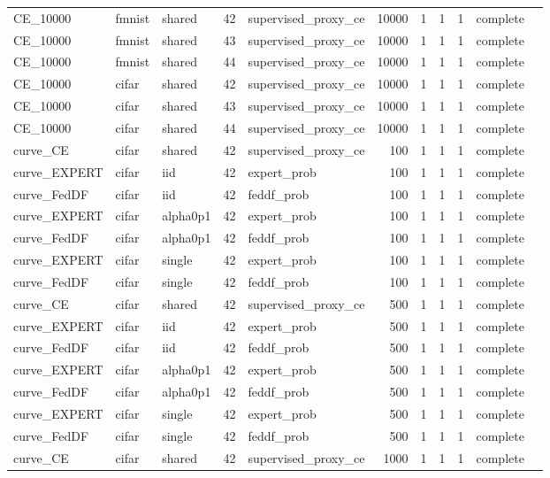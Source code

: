 \begin{tabular}{lllrlrrrrll}
CE\_10000 & fmnist & shared & 42 & supervised\_proxy\_ce & 10000 & 1 & 1 & 1 & complete &  \\
CE\_10000 & fmnist & shared & 43 & supervised\_proxy\_ce & 10000 & 1 & 1 & 1 & complete &  \\
CE\_10000 & fmnist & shared & 44 & supervised\_proxy\_ce & 10000 & 1 & 1 & 1 & complete &  \\
CE\_10000 & cifar & shared & 42 & supervised\_proxy\_ce & 10000 & 1 & 1 & 1 & complete &  \\
CE\_10000 & cifar & shared & 43 & supervised\_proxy\_ce & 10000 & 1 & 1 & 1 & complete &  \\
CE\_10000 & cifar & shared & 44 & supervised\_proxy\_ce & 10000 & 1 & 1 & 1 & complete &  \\
curve\_CE & cifar & shared & 42 & supervised\_proxy\_ce & 100 & 1 & 1 & 1 & complete &  \\
curve\_EXPERT & cifar & iid & 42 & expert\_prob & 100 & 1 & 1 & 1 & complete &  \\
curve\_FedDF & cifar & iid & 42 & feddf\_prob & 100 & 1 & 1 & 1 & complete &  \\
curve\_EXPERT & cifar & alpha0p1 & 42 & expert\_prob & 100 & 1 & 1 & 1 & complete &  \\
curve\_FedDF & cifar & alpha0p1 & 42 & feddf\_prob & 100 & 1 & 1 & 1 & complete &  \\
curve\_EXPERT & cifar & single & 42 & expert\_prob & 100 & 1 & 1 & 1 & complete &  \\
curve\_FedDF & cifar & single & 42 & feddf\_prob & 100 & 1 & 1 & 1 & complete &  \\
curve\_CE & cifar & shared & 42 & supervised\_proxy\_ce & 500 & 1 & 1 & 1 & complete &  \\
curve\_EXPERT & cifar & iid & 42 & expert\_prob & 500 & 1 & 1 & 1 & complete &  \\
curve\_FedDF & cifar & iid & 42 & feddf\_prob & 500 & 1 & 1 & 1 & complete &  \\
curve\_EXPERT & cifar & alpha0p1 & 42 & expert\_prob & 500 & 1 & 1 & 1 & complete &  \\
curve\_FedDF & cifar & alpha0p1 & 42 & feddf\_prob & 500 & 1 & 1 & 1 & complete &  \\
curve\_EXPERT & cifar & single & 42 & expert\_prob & 500 & 1 & 1 & 1 & complete &  \\
curve\_FedDF & cifar & single & 42 & feddf\_prob & 500 & 1 & 1 & 1 & complete &  \\
curve\_CE & cifar & shared & 42 & supervised\_proxy\_ce & 1000 & 1 & 1 & 1 & complete &  \\

\end{tabular}
